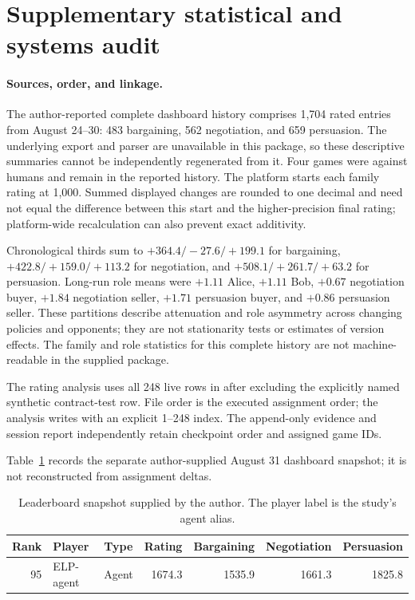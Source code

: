 \section{Supplementary statistical and systems audit}
\label{app:statistics}

\paragraph{Sources, order, and linkage.}
The author-reported complete dashboard history comprises 1,704 rated entries
from August 24--30: 483 bargaining, 562 negotiation, and 659 persuasion. The
underlying export and parser are unavailable in this package, so these
descriptive summaries cannot be independently regenerated from it. Four games
were against humans and remain in the reported history. The platform starts
each family rating at 1,000. Summed displayed changes are rounded to one
decimal and need not equal the difference between this start and the
higher-precision final rating; platform-wide recalculation can also prevent
exact additivity.

Chronological thirds sum to $+364.4/-27.6/+199.1$ for bargaining,
$+422.8/+159.0/+113.2$ for negotiation, and $+508.1/+261.7/+63.2$ for
persuasion. Long-run role means were $+1.11$ Alice, $+1.11$ Bob, $+0.67$
negotiation buyer, $+1.84$ negotiation seller, $+1.71$ persuasion buyer, and
$+0.86$ persuasion seller. These partitions describe attenuation and role
asymmetry across changing policies and opponents; they are not stationarity
tests or estimates of version effects. The family and role statistics for this
complete history are not machine-readable in the supplied package.

The rating analysis uses all 248 live rows in
 after excluding the explicitly named
synthetic contract-test row. File order is the executed assignment order; the
analysis writes  with an explicit
1--248 index. The append-only evidence and session report independently retain
checkpoint order and assigned game IDs.

Table~\ref{tab:leaderboard-snapshot} records the separate author-supplied
August 31 dashboard snapshot; it is not reconstructed from assignment deltas.
\begin{table}[t]
  \caption{Leaderboard snapshot supplied by the author. The player label is
  the study's agent alias.}
  \label{tab:leaderboard-snapshot}
  \centering\scriptsize
  \begin{tabular}{rllrrrr}
    \toprule
    Rank & Player & Type & Rating & Bargaining & Negotiation & Persuasion \\
    \midrule
    95 & ELP-agent & Agent & 1674.3 & 1535.9 & 1661.3 & 1825.8 \\
    \bottomrule
  \end{tabular}
\end{table}

